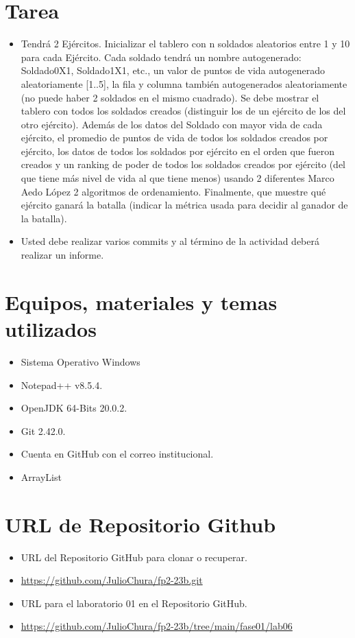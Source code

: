 \documentclass{article}
\begin{document}
	\section{Tarea}
	\begin{itemize}		
		\item 
		Tendrá 2 Ejércitos. Inicializar el tablero con n soldados aleatorios entre 1 y 10 para cada 
		Ejército. Cada soldado tendrá un nombre autogenerado: Soldado0X1, Soldado1X1, etc., un 
		valor de puntos de vida autogenerado aleatoriamente [1..5], la fila y columna también 
		autogenerados aleatoriamente (no puede haber 2 soldados en el mismo cuadrado). Se debe 
		mostrar el tablero con todos los soldados creados (distinguir los de un ejército de los del otro 
		ejército). Además de los datos del Soldado con mayor vida de cada ejército, el promedio de 
		puntos de vida de todos los soldados creados por ejército, los datos de todos los soldados por 
		ejército en el orden que fueron creados y un ranking de poder de todos los soldados creados
		por ejército (del que tiene más nivel de vida al que tiene menos) usando 2 diferentes 
		Marco Aedo López 2
		algoritmos de ordenamiento. Finalmente, que muestre qué ejército ganará la batalla (indicar 
		la métrica usada para decidir al ganador de la batalla).
		\item Usted debe realizar varios commits y al término de la actividad deberá realizar un informe.
		
	\end{itemize}
	
	\section{Equipos, materiales y temas utilizados}
	\begin{itemize}
		\item Sistema Operativo Windows
		\item Notepad++ v8.5.4.
		\item OpenJDK 64-Bits 20.0.2.
		\item Git 2.42.0.
		\item Cuenta en GitHub con el correo institucional.
		\item ArrayList
	\end{itemize}
	
	\section{URL de Repositorio Github}
	\begin{itemize}
		\item URL del Repositorio GitHub para clonar o recuperar.
		\item \url{https://github.com/JulioChura/fp2-23b.git}
		\item URL para el laboratorio 01 en el Repositorio GitHub.
		\item \url{https://github.com/JulioChura/fp2-23b/tree/main/fase01/lab06}
	\end{itemize}
	
\end{document}
